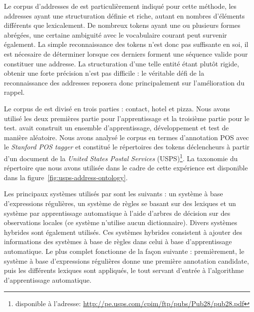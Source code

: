 \documentclass[PhD-Yoann-Dupont.tex]{subfiles}
\begin{document}
Le corpus d'addresses de \citet{yu2007high} est particulièrement indiqué pour cette méthode, les addresses ayant une structuration définie et riche, autant en nombres d'éléments différents que lexicalement. De nombreux tokens ayant une ou plusieurs formes abrégées, une certaine ambiguité avec le vocabulaire courant peut survenir également. La simple reconnaissance des tokens n'est donc pas suffisante en soi, il est nécesaire de déterminer lorsque ces derniers forment une séquence valide pour constituer une addresse. La structuration d'une telle entité étant plutôt rigide, obtenir une forte précision n'est pas difficile : le véritable défi de la reconnaissance des addresses reposera donc principalement sur l'amélioration du rappel.

Le corpus de \citet{yu2007high} est divisé en trois parties : contact, hotel et pizza. Nous avons utilisé les deux premières partie pour l'apprentissage et la troisième partie pour le test. \citet{yu2007high} avait construit un ensemble d'apprentissage, développement et test de manière aléatoire. Nous avons analysé le corpus en termes d'annotation POS avec le \textit{Stanford POS tagger} \citep{toutanova2003feature} et constitué le répertoires des tokens déclencheurs à partir d'un document de la \emph{United States Postal Services} (USPS)\footnote{disponible à l'adresse: \url{http://pe.usps.com/cpim/ftp/pubs/Pub28/pub28.pdf}}. La taxonomie du répertoire que nous avons utilisée dans le cadre de cette expérience est disponible dans la figure\ \ref{fig:usps-address-ontology}.

Les principaux systèmes utilisés par \citet{yu2007high} sont les suivants : un système à base d'expressions régulières, un système de règles se basant sur des lexiques et un système par apprentissage automatique à l'aide d'arbres de décision sur des observations locales (ce système n'utilise aucun dictionnaire). Divers systèmes hybrides sont également utilisés. Ces systèmes hybrides consistent à ajouter des informations des systèmes à base de règles dans celui à base d'apprentissage automatique. Le plus complet fonctionne de la façon suivante : premièrement, le système à base d'expressions régulières donne une première annotation candidate, puis les différents lexiques sont appliqués, le tout servant d'entrée à l'algorithme d'apprentissage automatique.
\end{document}
